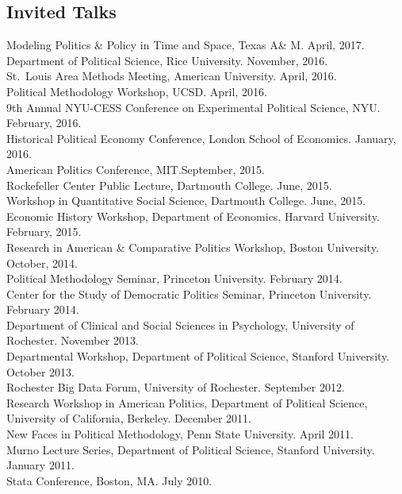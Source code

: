 \documentclass[margin,line,12pt]{res}
\begin{document}
\begin{resume}
\section{\textsf{\sc Invited Talks}}

Modeling Politics \& Policy in Time and Space, Texas A\& M. April, 2017. \\ 
Department of Political Science, Rice University. November, 2016. \\
St.\ Louis Area Methods Meeting, American University. April, 2016. \\
Political Methodology Workshop, UCSD. April, 2016. \\
9th Annual NYU-CESS Conference on Experimental Political Science, NYU. February, 2016. \\
Historical Political Economy Conference, London School of Economics. January, 2016. \\
American Politics Conference, MIT.\@ September, 2015. \\
Rockefeller Center Public Lecture, Dartmouth College. June, 2015.\\
Workshop in Quantitative Social Science, Dartmouth College. June, 2015.\\
Economic History Workshop, Department of Economics, Harvard University. February, 2015.\\
Research in American \& Comparative Politics Workshop, Boston University. October, 2014.\\
Political Methodology Seminar, Princeton University. February 2014. \\
Center for the Study of Democratic Politics Seminar, Princeton University. February 2014.\\
Department of Clinical and Social Sciences in Psychology, University of Rochester. November 2013.\\
Departmental Workshop, Department of Political Science, Stanford University. October 2013.\\
Rochester Big Data Forum, University of Rochester. September 2012.\\
Research Workshop in American Politics, Department of Political Science, University of California, Berkeley. December 2011.\\
New Faces in Political Methodology, Penn State University. April 2011. \\
Murno Lecture Series, Department of Political Science, Stanford University. January 2011. \\
Stata Conference, Boston, MA\@. July 2010.


\end{resume}
\end{document}
